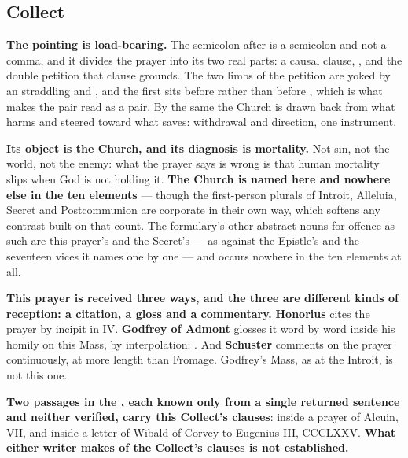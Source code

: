 \elementguard
\subsection*{Collect }


\textbf{The pointing is load-bearing.} The semicolon after  is
a semicolon and not a comma, and it divides the prayer into its two real parts:
a causal clause, , and the double
petition that clause grounds. The two limbs of the petition are yoked by an
 straddling  and , and
the first  sits before  rather than before
, which is what makes the pair read as a pair. By the same
 the Church is drawn back from what harms and steered toward
what saves: withdrawal and direction, one instrument.

\textbf{Its object is the Church, and its diagnosis is mortality.} Not sin, not
the world, not the enemy: what the prayer says is wrong is that human mortality
slips when God is not holding it. \textbf{The Church is named here and nowhere
else in the ten elements} --- though the first-person plurals of Introit,
Alleluia, Secret and Postcommunion are corporate in their own way, which softens
any contrast built on that count. The formulary's other abstract nouns for
offence as such are this prayer's  and the Secret's
 --- as against the Epistle's  and the
seventeen vices it names one by one --- and  occurs nowhere in
the ten elements at all.

\textbf{This prayer is received three ways, and the three are different kinds
of reception: a citation, a gloss and a commentary.} \textbf{Honorius} cites the
prayer by incipit in  IV. \textbf{Godfrey of Admont} glosses
it word by word inside his homily on this Mass, by interpolation: . And \textbf{Schuster} comments on the prayer
continuously, at more length than Fromage. Godfrey's Mass, as at the Introit,
is not this one.

\textbf{Two passages in the , each known only from a
single returned sentence and neither verified, carry this Collect's clauses}:
inside a prayer of Alcuin,  VII, and inside a letter of
Wibald of Corvey to Eugenius III,  CCCLXXV. \textbf{What either
writer makes of the Collect's clauses is not established.}

